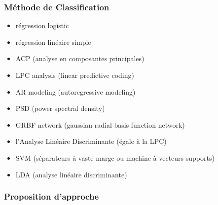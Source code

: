 \documentclass[12pt,]{article}
\providecommand{\tightlist}{%
  \setlength{\itemsep}{0pt}\setlength{\parskip}{0pt}}
\begin{document}
\hypertarget{methode-de-classification}{%
\subsubsection{Méthode de
Classification}\label{methode-de-classification}}

\begin{itemize}
\tightlist
\item
  régression logistic
\item
  régression linéaire simple
\item
  ACP (analyse en composantes principales)
\item
  LPC analysis (linear predictive coding)
\item
  AR modeling (autoregressive modeling)
\item
  PSD (power spectral density)
\item
  GRBF network (gaussian radial basis function network)
\item
  l'Analyse Linéaire Discriminante (égale à la LPC)
\item
  SVM (séparateurs à vaste marge ou machine à vecteurs supports)
\item
  LDA (analyse linéaire discriminante)
\end{itemize}

\hypertarget{proposition-dapproche}{%
\subsubsection{Proposition d'approche}\label{proposition-dapproche}}
\end{document}
